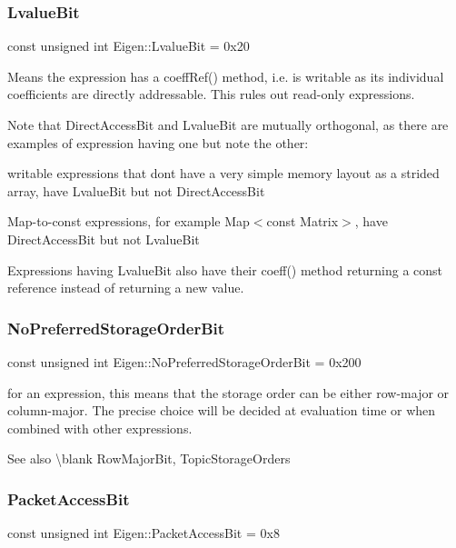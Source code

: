 \subsubsection{\texorpdfstring{LvalueBit}{LvalueBit}}
{\footnotesize\ttfamily const unsigned int Eigen\+::\+Lvalue\+Bit = 0x20}

Means the expression has a coeff\+Ref() method, i.\+e. is writable as its individual coefficients are directly addressable. This rules out read-\/only expressions.

Note that Direct\+Access\+Bit and Lvalue\+Bit are mutually orthogonal, as there are examples of expression having one but note the other\+: \begin{DoxyItemize}
\item writable expressions that don\textquotesingle{}t have a very simple memory layout as a strided array, have Lvalue\+Bit but not Direct\+Access\+Bit \item Map-\/to-\/const expressions, for example Map$<$const Matrix$>$, have Direct\+Access\+Bit but not Lvalue\+Bit\end{DoxyItemize}
Expressions having Lvalue\+Bit also have their coeff() method returning a const reference instead of returning a new value. \mbox{\label{group__flags_ga3c186ad80ddcf5e2ed3d7ee31cca1860}} 
\subsubsection{\texorpdfstring{NoPreferredStorageOrderBit}{NoPreferredStorageOrderBit}}
{\footnotesize\ttfamily const unsigned int Eigen\+::\+No\+Preferred\+Storage\+Order\+Bit = 0x200}

for an expression, this means that the storage order can be either row-\/major or column-\/major. The precise choice will be decided at evaluation time or when combined with other expressions. \begin{DoxySeeAlso}{See also}
\textbackslash{}blank Row\+Major\+Bit, Topic\+Storage\+Orders 
\end{DoxySeeAlso}
\mbox{\label{group__flags_ga1a306a438e1ab074e8be59512e887b9f}} 
\subsubsection{\texorpdfstring{PacketAccessBit}{PacketAccessBit}}
{\footnotesize\ttfamily const unsigned int Eigen\+::\+Packet\+Access\+Bit = 0x8}

